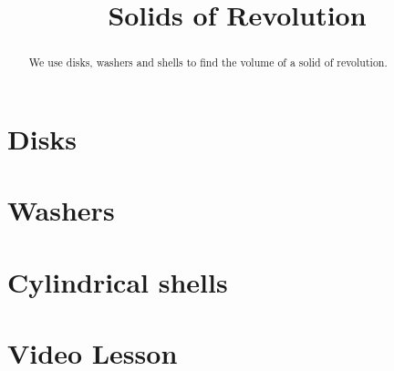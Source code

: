 \documentclass{ximera}
\title{Solids of Revolution}
\begin{document}
\begin{abstract}
We use disks, washers and shells to find the volume of a solid of revolution.
\end{abstract}

\maketitle


\section{Disks}


\section{Washers}

\section{Cylindrical shells}






































\section{Video Lesson}




\begin{center}
\begin{foldable}
\end{foldable}
\end{center}
\end{document}
